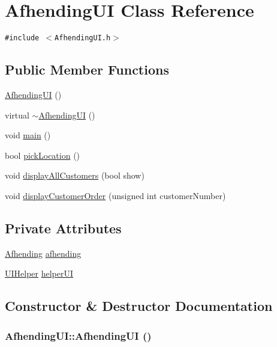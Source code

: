 \hypertarget{class_afhending_u_i}{
\section{Afhending\-UI Class Reference}
\label{class_afhending_u_i}
}
{\tt \#include $<$Afhending\-UI.h$>$}

\subsection*{Public Member Functions}
\begin{CompactItemize}
\item 
\hyperlink{class_afhending_u_i_9ab844012d187620ec223d97b0b27720}{Afhending\-UI} ()
\item 
virtual \hyperlink{class_afhending_u_i_398025b0c879d72ea859f73a2af03cac}{$\sim$Afhending\-UI} ()
\item 
void \hyperlink{class_afhending_u_i_ea83b916b3f52eec32ae6d54d59b4453}{main} ()
\item 
bool \hyperlink{class_afhending_u_i_74d0d6b7d7493e8a9703bc8fbeb79f2e}{pick\-Location} ()
\item 
void \hyperlink{class_afhending_u_i_388ec3e6c0999970759fa9fdcacda10e}{display\-All\-Customers} (bool show)
\item 
void \hyperlink{class_afhending_u_i_537283a7f7677384872f66c6b1dc4491}{display\-Customer\-Order} (unsigned int customer\-Number)
\end{CompactItemize}
\subsection*{Private Attributes}
\begin{CompactItemize}
\item 
\hyperlink{class_afhending}{Afhending} \hyperlink{class_afhending_u_i_6d54613ddac2c68ed16224a0ac770eb5}{afhending}
\item 
\hyperlink{class_u_i_helper}{UIHelper} \hyperlink{class_afhending_u_i_165ca02db075e280199e0970e3465900}{helper\-UI}
\end{CompactItemize}


\subsection{Constructor \& Destructor Documentation}
\hypertarget{class_afhending_u_i_9ab844012d187620ec223d97b0b27720}{
\subsubsection[AfhendingUI]{\setlength{\rightskip}{0pt plus 5cm}Afhending\-UI::Afhending\-UI ()}}
\label{class_afhending_u_i_9ab844012d187620ec223d97b0b27720}


